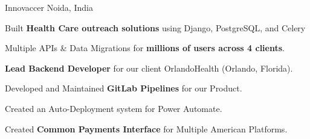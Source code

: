 \begin{cventries}
  \cventry
    {Innovaccer} %
    {Noida, India} %
    {} %
    {} %
    {
      \begin{cvitems} %
        \item {Built \textbf{Health Care outreach solutions} using Django, PostgreSQL, and Celery}
        \item {Multiple APIs \& Data Migrations for \textbf{millions of users across 4 clients}.}
        \item {\textbf{Lead Backend Developer} for our client OrlandoHealth (Orlando, Florida).}
        \item {Developed and Maintained \textbf{GitLab Pipelines} for our Product.}
        \item {Created an Auto-Deployment system for Power Automate.}
        \item {Created \textbf{Common Payments Interface} for Multiple American Platforms.}
      \end{cvitems}
    }
\end{cventries}
